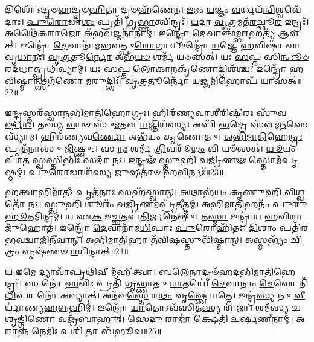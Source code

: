 𑌦𑌿𑌶𑍋᳴\-𑌽𑌦𑍃𑍞𑌹𑌦𑍍𑌦𑍃𑍞\-\ul{𑌹𑌿}\-𑌤𑌾 𑌦𑍃𑍞𑌹᳴𑌣𑍇𑌨।
\-\ul{𑌇}\-𑌮𑌂 \ul{𑌯}\-𑌜𑍍𑌞𑌂 \ul{𑌵}\-𑌰𑍍𑌧𑌯᳴\-\ul{𑌨𑍍𑌵𑌿}\-𑌶𑍍𑌵\-𑌵𑍇᳴𑌦𑌾𑌃।
\-\ul{𑌪𑍁}\-\-\ul{𑌰𑍋}\-𑌡𑌾\-\ul{𑌶𑌂} 𑌪𑍍𑌰𑌤𑌿᳴ 𑌗𑍃\-\ul{𑌭𑍍𑌣𑌾}\-𑌤𑍍𑌵𑌿𑌨𑍍𑌦𑍍𑌰𑌃᳴।
\-\ul{𑌯}\-𑌦𑌾 \ul{𑌵𑍃}\-𑌤𑍍𑌰𑌮𑌤᳴\-\ul{𑌰}\-𑌚𑍍𑌛𑍂\-\ul{𑌰} 𑌇𑌨𑍍𑌦𑍍𑌰𑌃᳴।
𑌅𑌥𑍈᳴𑌕\-\ul{𑌰𑌾}\-𑌜𑍋 𑌅᳴𑌭\-\ul{𑌵}\-𑌜𑍍𑌜𑌨𑌾᳴𑌨𑌾𑌮𑍍।
𑌇𑌨𑍍𑌦𑍍𑌰𑍋᳴ \ul{𑌦𑍇}\-𑌵𑌾𑌞𑍍𑌛᳴𑌮𑍍𑌬\-\ul{𑌰}\-𑌹𑌤𑍍𑌯᳴ 𑌆𑌵𑌤𑍍।
𑌇𑌨𑍍𑌦𑍍𑌰𑍋᳴ \ul{𑌦𑍇}\-𑌵𑌾𑌨𑌾᳴𑌮𑌭𑌵𑌤𑍍𑌪𑍁\-\ul{𑌰𑍋}\-𑌗𑌾𑌃।
𑌇𑌨𑍍𑌦𑍍𑌰𑍋᳴ \ul{𑌯}\-𑌜𑍍𑌞𑍇 \ul{𑌹}\-𑌵𑌿𑌷𑌾᳴ 𑌵𑌾𑌵𑍃\-\ul{𑌧𑌾}\-𑌨𑌃।
\-\ul{𑌵𑍃}\-\-\ul{𑌤𑍍𑌰}\-𑌤𑍂\-\ul{𑌰𑍍𑌨𑍋} 𑌅𑌭᳴\-\ul{𑌯}\-\-\ul{𑍞} 𑌶𑌰𑍍𑌮᳴ 𑌯𑍞𑌸𑌤𑍍।
𑌯𑌃 \ul{𑌸}\-𑌪𑍍𑌤 𑌸𑌿\-\ul{𑌨𑍍𑌧𑍂}\-\-\ul{𑍞} 𑌰𑌦᳴𑌧𑌾𑌤𑍍𑌪𑍃\-\ul{𑌥𑌿}\-𑌵𑍍𑌯𑌾𑌮𑍍।
𑌯𑌃 \ul{𑌸}\-𑌪𑍍𑌤 \ul{𑌲𑍋}\-𑌕𑌾𑌨𑌕𑍃᳴\-\ul{𑌣𑍋}\-𑌦𑍍𑌦𑌿𑌶᳴𑌶𑍍𑌚।
𑌇𑌨𑍍𑌦𑍍𑌰𑍋᳴ \ul{𑌹}\-𑌵𑌿\-\ul{𑌷𑍍𑌮𑌾}\-𑌨𑍍𑌥𑍍𑌸𑌗᳴𑌣𑍋 \ul{𑌮}\-𑌰𑍁𑌦𑍍𑌭𑌿𑌃᳴।
\-\ul{𑌵𑍃}\-\-\ul{𑌤𑍍𑌰}\-𑌤𑍂𑌰𑍍𑌨𑍋᳴ \ul{𑌯}\-𑌜𑍍𑌞\-\ul{𑌮𑌿}\-𑌹𑍋𑌪᳴ 𑌯𑌾𑌸𑌤𑍍॥22॥\anuvakamend[\-\ul{𑌵}\-\-\ul{𑌵}\-\-\ul{𑌰𑍍𑌥} \ul{𑌵𑌿}\-\-\ul{𑌥𑍍𑌸} 𑌇𑌨𑍍𑌦𑍍𑌰᳴\-\ul{𑌸𑍍𑌤𑍁}\-𑌰𑌾𑌯𑌾॑𑌸𑍍𑌤𑍁 𑌵𑍃\-\ul{𑌤𑍍𑌰}\-𑌤𑍂\-\ul{𑌰𑍍𑌯𑍇} 𑌵𑌜𑍍𑌰᳴𑌬𑌾𑌹𑍁𑌃 𑌪𑍃\-\ul{𑌥𑌿}\-𑌵𑍍𑌯𑌾𑌨𑍍𑌤𑍍𑌰𑍀𑌣𑌿᳴ 𑌚]

𑌇\-\ul{𑌨𑍍𑌦𑍍𑌰}\-𑌸𑍍𑌤𑌰᳴𑌸𑍍𑌵𑌾𑌨𑌭𑌿𑌮𑌾\-\ul{𑌤𑌿}\-𑌹𑍋𑌗𑍍𑌰𑌃।
𑌹𑌿𑌰᳴𑌣𑍍𑌯𑌵𑌾𑌶𑍀𑌰𑌿\-\ul{𑌷𑌿}\-𑌰𑌃 𑌸𑍁᳴\-\ul{𑌵}\-\-\ul{𑌰𑍍}\-𑌷𑌾𑌃।
𑌤𑌸𑍍𑌯᳴ \ul{𑌵}\-𑌯𑍞 𑌸𑍁᳴\-\ul{𑌮}\-𑌤𑍗 \ul{𑌯}\-𑌜𑍍𑌞𑌿𑌯᳴𑌸𑍍𑌯।
𑌅𑌪𑌿᳴ \ul{𑌭}\-𑌦𑍍𑌰𑍇 𑌸𑍗᳴𑌮\-\ul{𑌨}\-𑌸𑍇 𑌸𑍍𑌯𑌾᳴𑌮।
𑌹𑌿𑌰᳴𑌣𑍍𑌯𑌵\-\ul{𑌰𑍍𑌣𑍋} 𑌅𑌭᳴𑌯𑌂 𑌕𑍃𑌣𑍋𑌤𑍁।
\-\ul{𑌅}\-\-\ul{𑌭𑌿}\-\-\ul{𑌮𑌾}\-\-\ul{𑌤𑌿}\-𑌹𑍇\-\ul{𑌨𑍍𑌦𑍍𑌰𑌃} 𑌪𑍃𑌤᳴𑌨𑌾𑌸𑍁 \ul{𑌜𑌿}\-𑌷𑍍𑌣𑍁𑌃।
𑌸 \ul{𑌨𑌃} 𑌶𑌰𑍍𑌮᳴ \ul{𑌤𑍍𑌰𑌿}\-𑌵𑌰𑍂᳴\-\ul{𑌥𑌂} 𑌵𑌿 𑌯𑍞᳴𑌸𑌤𑍍।
\-\ul{𑌯𑍂}\-𑌯𑌂 𑌪𑌾᳴𑌤 \ul{𑌸𑍍𑌵}\-𑌸𑍍𑌤𑌿\-\ul{𑌭𑌿𑌃} 𑌸𑌦𑌾᳴ 𑌨𑌃।
𑌇𑌨𑍍𑌦𑍍𑌰𑍟᳴ 𑌸𑍍𑌤𑍁𑌹𑌿 \ul{𑌵}\-𑌜𑍍𑌰𑌿\-\ul{𑌣}\-\-\ul{𑍟} 𑌸𑍍𑌤𑍋𑌮᳴𑌪𑍃𑌷𑍍𑌠𑌮𑍍।
\-\ul{𑌪𑍁}\-\-\ul{𑌰𑍋}\-𑌡𑌾𑌶᳴𑌸𑍍𑌯 𑌜𑍁𑌷𑌤𑌾𑍞 \ul{𑌹}\-𑌵𑌿𑌰𑍍𑌨𑌃᳴॥23॥

\-\ul{𑌹}\-𑌤𑍍𑌵𑌾𑌭𑌿𑌮𑌾᳴\-\ul{𑌤𑍀𑌃} 𑌪𑍃𑌤᳴\-\ul{𑌨𑌾𑌃} 𑌸𑌹᳴𑌸𑍍𑌵𑌾𑌨𑍍।
𑌅𑌥𑌾𑌭᳴𑌯𑌂 𑌕𑍃𑌣𑍁𑌹𑌿 \ul{𑌵𑌿}\-𑌶𑍍𑌵𑌤𑍋᳴ 𑌨𑌃।
\-\ul{𑌸𑍍𑌤𑍁}\-𑌹𑌿 𑌶𑍂𑌰𑌂᳴ \ul{𑌵}\-𑌜𑍍𑌰𑌿\-\ul{𑌣}\-𑌮𑌪𑍍𑌰᳴𑌤𑍀𑌤𑍍𑌤𑌮𑍍।
\-\ul{𑌅}\-\-\ul{𑌭𑌿}\-\-\ul{𑌮𑌾}\-\-\ul{𑌤𑌿}\-𑌹𑌨𑌂᳴ 𑌪𑍁𑌰𑍁\-\ul{𑌹𑍂}\-𑌤𑌮𑌿𑌨𑍍𑌦𑍍𑌰𑌮𑍍॑।
𑌯 𑌏\-\ul{𑌕} 𑌇\-\ul{𑌚𑍍𑌛}\-𑌤𑌪᳴\-\ul{𑌤𑌿}\-𑌰𑍍𑌜𑌨𑍇᳴𑌷𑍁।
𑌤\-\ul{𑌸𑍍𑌮𑌾} 𑌇𑌨𑍍𑌦𑍍𑌰𑌾᳴𑌯 \ul{𑌹}\-𑌵𑌿𑌰𑌾 𑌜𑍁᳴𑌹𑍋𑌤।
𑌇𑌨𑍍𑌦𑍍𑌰𑍋᳴ \ul{𑌦𑍇}\-𑌵𑌾𑌨𑌾᳴𑌮\-\ul{𑌧𑌿}\-𑌪𑌾𑌃 \ul{𑌪𑍁}\-𑌰𑍋𑌹𑌿᳴𑌤𑌃।
\-\ul{𑌦𑌿}\-𑌶𑌾𑌂 𑌪𑌤𑌿᳴𑌰𑌭𑌵\-\ul{𑌦𑍍𑌵𑌾}\-𑌜𑌿𑌨𑍀᳴𑌵𑌾𑌨𑍍।
\-\ul{𑌅}\-\-\ul{𑌭𑌿}\-\-\ul{𑌮𑌾}\-\-\ul{𑌤𑌿}\-𑌹𑌾 𑌤᳴\-\ul{𑌵𑌿}\-𑌷𑌸𑍍𑌤𑍁𑌵𑌿᳴𑌷𑍍𑌮𑌾𑌨𑍍।
\-\ul{𑌅}\-𑌸𑍍𑌮𑌭𑍍𑌯𑌂᳴ \ul{𑌚𑌿}\-𑌤𑍍𑌰𑌂 𑌵𑍃𑌷᳴𑌣𑍞 \ul{𑌰}\-𑌯𑌿𑌨𑍍𑌦𑌾॑𑌤𑍍॥24॥

𑌯 \ul{𑌇}\-𑌮𑍇 𑌦𑍍𑌯𑌾𑌵𑌾᳴𑌪𑍃\-\ul{𑌥𑌿}\-𑌵𑍀 𑌮᳴\-\ul{𑌹𑌿}\-𑌤𑍍𑌵𑌾।
𑌬\-\ul{𑌲𑍇}\-𑌨𑌾𑌦𑍃𑍞᳴𑌹𑌦𑌭𑌿𑌮𑌾\-\ul{𑌤𑌿}\-𑌹𑍇𑌨𑍍𑌦𑍍𑌰𑌃᳴।
𑌸 𑌨𑍋᳴ \ul{𑌹}\-𑌵𑌿𑌃 𑌪𑍍𑌰𑌤𑌿᳴ 𑌗𑍃𑌭𑍍𑌣𑌾𑌤𑍁 \ul{𑌰𑌾}\-𑌤𑌯𑍇॑।
\-\ul{𑌦𑍇}\-𑌵𑌾𑌨𑌾𑌂॑ \ul{𑌦𑍇}\-𑌵𑍋 𑌨𑌿᳴\-\ul{𑌧𑌿}\-𑌪𑌾 𑌨𑍋᳴ 𑌅𑌵𑍍𑌯𑌾𑌤𑍍।
𑌅𑌨᳴𑌵\-\ul{𑌸𑍍𑌤𑍇} 𑌰\-\ul{𑌥𑌂} 𑌵𑍃\-\ul{𑌷𑍍𑌣𑍇} 𑌯𑌤𑍍𑌤𑍇॑।
𑌇𑌨𑍍𑌦𑍍𑌰᳴\-\ul{𑌸𑍍𑌯} 𑌨𑍁 \ul{𑌵𑍀}\-𑌰𑍍𑌯𑌾॑𑌣𑍍𑌯\-\ul{𑌹}\-𑌨𑍍𑌨𑌹𑌿𑌮𑍍॑।
𑌇𑌨𑍍𑌦𑍍𑌰𑍋᳴ \ul{𑌯𑌾}\-𑌤𑍋\-𑌽𑌵᳴𑌸𑌿𑌤\-\ul{𑌸𑍍𑌯} 𑌰𑌾𑌜𑌾॑।
𑌶𑌮᳴𑌸𑍍𑌯 𑌚 \ul{𑌶𑍃}\-𑌙𑍍𑌗𑌿\-\ul{𑌣𑍋} 𑌵𑌜𑍍𑌰᳴𑌬𑌾𑌹𑍁𑌃।
𑌸𑍇\-\ul{𑌦𑍁} 𑌰𑌾𑌜𑌾॑ 𑌕𑍍𑌷𑍇𑌤𑌿 𑌚𑌰𑍍\mbox{}𑌷\-\ul{𑌣𑍀}\-𑌨𑌾𑌮𑍍।
\-\ul{𑌅}\-𑌰𑌾𑌨𑍍𑌨 \ul{𑌨𑍇}\-𑌮𑌿𑌃 𑌪\-\ul{𑌰𑌿} 𑌤𑌾 𑌬᳴𑌭𑍂𑌵॥25॥

